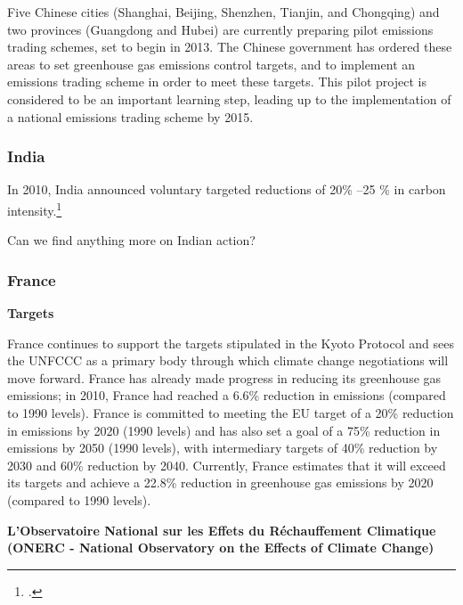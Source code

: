 Five Chinese cities (Shanghai, Beijing, Shenzhen, Tianjin, and Chongqing) and two provinces (Guangdong and Hubei) are currently preparing pilot emissions trading schemes, set to begin in 2013. 
The Chinese government has ordered these areas to set greenhouse gas emissions control targets, and to implement an emissions trading scheme in order to meet these targets. 
This pilot project is considered to be an important learning step, leading up to the implementation of a national emissions trading scheme by 2015.



	\subsubsection{India}



 In 2010, India announced voluntary targeted reductions of 20\% --25 \% in carbon intensity.\footcite[][p. 108]{UNHumanDev2013}



\begin{vcom}
Can we find anything more on Indian action?
\end{vcom}



	\subsubsection{France}
	


\textbf{Targets}



France continues to support the targets stipulated in the Kyoto Protocol and sees the UNFCCC as a primary body through which climate change negotiations will move forward. 
France has already made progress in reducing its greenhouse gas emissions; in 2010, France had reached a 6.6\% reduction in emissions (compared to 1990 levels). 
France is committed to meeting the EU target of a 20\% reduction in emissions by 2020 (1990 levels) and has also set a goal of a 75\% reduction in emissions by 2050 (1990 levels), with intermediary targets of 40\% reduction by 2030 and 60\% reduction by 2040.  
Currently, France estimates that it will exceed its targets and achieve a 22.8\% reduction in greenhouse gas emissions by 2020 (compared to 1990 levels).



\textbf{L’Observatoire National sur les Effets du Réchauffement Climatique (ONERC - National Observatory on the Effects of Climate Change)}



